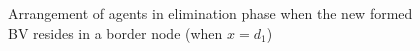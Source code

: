 \begin{itemize}
\begin{figure} [H]
    \caption{Arrangement of agents in elimination phase when the new formed BV resides in a border node (when $x=d_1$)} 
  \label{fig:casetwo} %
\end{figure}


\end{itemize}
